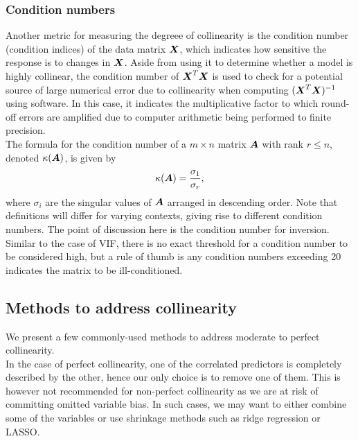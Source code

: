\documentclass[12pt]{article}
\begin{document}
	\subsubsection{Condition numbers}
	Another metric for measuring the degreee of collinearity is the condition number (condition indices) of the data matrix $\boldsymbol{X}$, which indicates how sensitive the response is to changes in $\boldsymbol{X}$. Aside from using it to determine whether a model is highly collinear, the condition number of $\boldsymbol{X}^T\boldsymbol{X}$ is used to check for a potential source of large numerical error due to collinearity when computing $(\boldsymbol{X}^T\boldsymbol{X})^{-1}$ using software. In this case, it indicates the multiplicative factor to which round-off errors are amplified due to computer arithmetic being performed to finite precision.\\
	
	The formula for the condition number of a $m\times n$ matrix $\boldsymbol{A}$ with rank $r\leq n$, denoted $\kappa(\boldsymbol{A})$, is given by
	\begin{equation}
		\kappa(\boldsymbol{A})=\frac{\sigma_1}{\sigma_r},
	\end{equation}
	where $\sigma_i$ are the singular values of $\boldsymbol{A}$ arranged in descending order. Note that definitions will differ for varying contexts, giving rise to different condition numbers. The point of discussion here is the condition number for inversion.\\
	
	Similar to the case of VIF, there is no exact threshold for a condition number to be considered high, but a rule of thumb is any condition numbers exceeding 20 indicates the matrix to be ill-conditioned. 
	
	\subsection{Methods to address collinearity\label{sec:3.2}}
	
	We present a few commonly-used methods to address moderate to perfect collinearity. \\
	
	In the case of perfect collinearity, one of the correlated predictors is completely described by the other, hence our only choice is to remove one of them. This is however not recommended for non-perfect collinearity as we are at risk of committing omitted variable bias. In such cases, we may want to either combine some of the variables \cite{James2023} or use shrinkage methods such as ridge regression or LASSO.\\
	
\end{document}
